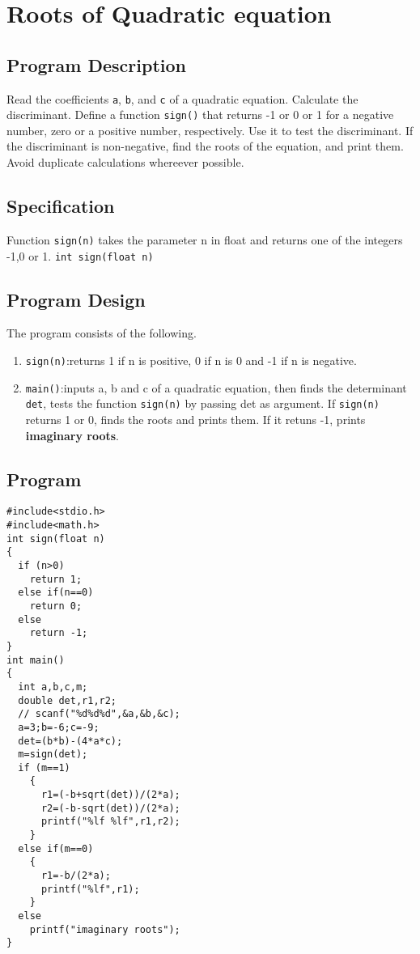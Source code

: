 \documentclass[11pt]{article}
\begin{document}
\section{Roots of Quadratic equation}
\label{sec-5}

\subsection*{Program Description}
\label{sec-5-1}
Read the coefficients \texttt{a}, \texttt{b}, and \texttt{c} of a quadratic
equation. Calculate the discriminant.  Define a function \texttt{sign()}
that returns -1 or 0 or 1 for a negative number, zero or a positive
number, respectively. Use it to test the discriminant. If the
discriminant is non-negative, find the roots of the equation, and
print them. Avoid duplicate calculations whereever possible.

\subsection*{Specification}
\label{sec-5-2}
Function \texttt{sign(n)} takes the parameter n in float and returns one
of the integers -1,0 or 1.  \texttt{int sign(float n)}

\subsection*{Program Design}
\label{sec-5-3}
The program consists of the following.
\begin{enumerate}
\item \texttt{sign(n)}:returns 1 if n is positive, 0 if n is 0 and -1 if n
is negative.
\item \texttt{main()}:inputs a, b and c of a quadratic equation, then finds
the determinant \texttt{det}, tests the function \texttt{sign(n)} by passing
det as argument.  If \texttt{sign(n)} returns 1 or 0, finds the roots
and prints them. If it retuns -1, prints \textbf{imaginary roots}.
\end{enumerate}

\subsection*{Program}
\label{sec-5-4}
\begin{verbatim}
#include<stdio.h>
#include<math.h>
int sign(float n)
{
  if (n>0)
    return 1;
  else if(n==0)
    return 0;
  else
    return -1;
}
int main()
{
  int a,b,c,m;
  double det,r1,r2;
  // scanf("%d%d%d",&a,&b,&c);
  a=3;b=-6;c=-9;
  det=(b*b)-(4*a*c);
  m=sign(det);
  if (m==1)
    {
      r1=(-b+sqrt(det))/(2*a);
      r2=(-b-sqrt(det))/(2*a);
      printf("%lf %lf",r1,r2);
    }
  else if(m==0)
    {
      r1=-b/(2*a);
      printf("%lf",r1);
    }
  else
    printf("imaginary roots");
}
\end{verbatim}
\end{document}
